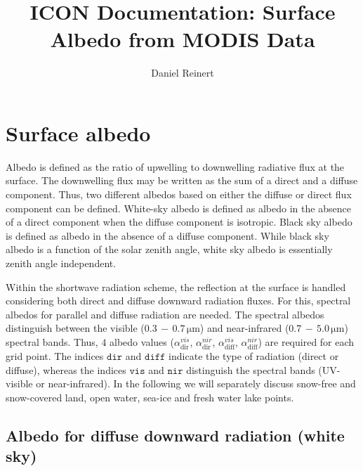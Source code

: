 \documentclass[a4paper,11pt]{article}
\author{Daniel Reinert}
\title{ICON Documentation: Surface Albedo from MODIS Data}
\begin{document}
  \maketitle



\section{Surface albedo}
Albedo is defined as the ratio of upwelling to downwelling radiative flux at the surface. The downwelling flux may be written as the sum of a direct and a diffuse component. Thus, two 
different albedos based on either the diffuse or direct flux component can be defined. White-sky albedo is defined as albedo in the absence of a direct component when the diffuse 
component is isotropic. Black sky albedo is defined as albedo in the absence of a diffuse component. While black sky albedo is a function of the solar zenith angle, white sky albedo 
is essentially zenith angle independent.

Within the shortwave radiation scheme, the reflection at the surface is handled considering both direct and diffuse downward radiation fluxes. For this, spectral albedos for parallel and 
diffuse radiation are needed. The spectral albedos distinguish between the visible ($0.3\,-\,0.7\,\mathrm{\mu m}$) and near-infrared ($0.7\,-\,5.0\,\mathrm{\mu m}$) spectral bands. Thus, 
$4$ albedo values ($\alpha_{\mathrm{dir}}^{vis}$, $\alpha_{\mathrm{dir}}^{nir}$, $\alpha_{\mathrm{diff}}^{vis}$, $\alpha_{\mathrm{diff}}^{nir}$) are required for each grid point. The 
indices $\mathtt{dir}$ and $\mathtt{diff}$ indicate the type of radiation (direct or diffuse), whereas the indices $\mathtt{vis}$ and $\mathtt{nir}$ distinguish the spectral bands 
(UV-visible or near-infrared). In the following we will separately discuss snow-free and snow-covered land, open water, sea-ice and fresh water lake points.


\subsection{Albedo for diffuse downward radiation (white sky)}
\end{document}
